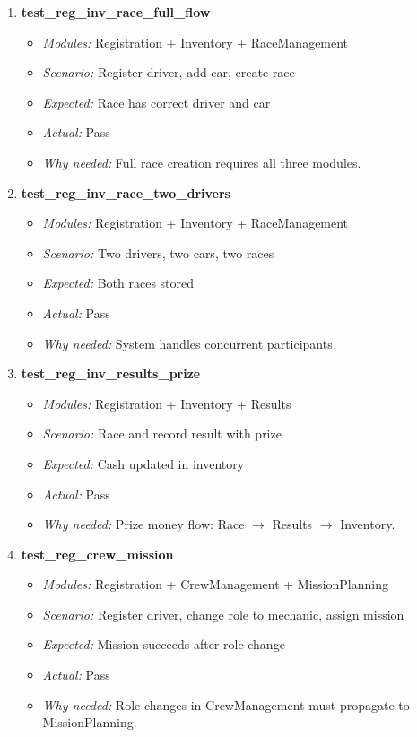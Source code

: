 \documentclass{article}
\begin{document}
\begin{enumerate}[resume, label=\textbf{TC\arabic*.}]

\item \textbf{test\_reg\_inv\_race\_full\_flow}
\begin{itemize}[noitemsep]
  \item \textit{Modules:} Registration + Inventory + RaceManagement
  \item \textit{Scenario:} Register driver, add car, create race
  \item \textit{Expected:} Race has correct driver and car
  \item \textit{Actual:} Pass
  \item \textit{Why needed:} Full race creation requires all three modules.
\end{itemize}

\item \textbf{test\_reg\_inv\_race\_two\_drivers}
\begin{itemize}[noitemsep]
  \item \textit{Modules:} Registration + Inventory + RaceManagement
  \item \textit{Scenario:} Two drivers, two cars, two races
  \item \textit{Expected:} Both races stored
  \item \textit{Actual:} Pass
  \item \textit{Why needed:} System handles concurrent participants.
\end{itemize}

\item \textbf{test\_reg\_inv\_results\_prize}
\begin{itemize}[noitemsep]
  \item \textit{Modules:} Registration + Inventory + Results
  \item \textit{Scenario:} Race and record result with prize
  \item \textit{Expected:} Cash updated in inventory
  \item \textit{Actual:} Pass
  \item \textit{Why needed:} Prize money flow: Race $\to$ Results $\to$ Inventory.
\end{itemize}

\item \textbf{test\_reg\_crew\_mission}
\begin{itemize}[noitemsep]
  \item \textit{Modules:} Registration + CrewManagement + MissionPlanning
  \item \textit{Scenario:} Register driver, change role to mechanic, assign mission
  \item \textit{Expected:} Mission succeeds after role change
  \item \textit{Actual:} Pass
  \item \textit{Why needed:} Role changes in CrewManagement must propagate to MissionPlanning.
\end{itemize}


\end{enumerate}
\end{document}

